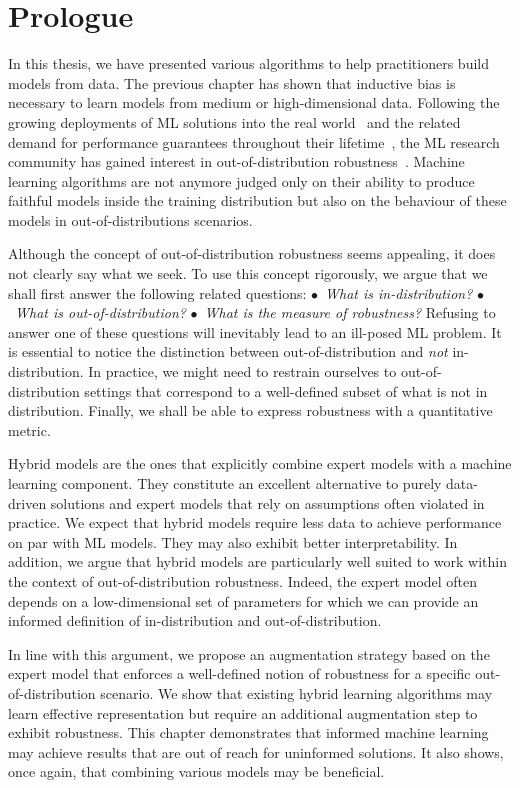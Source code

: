 \section{Prologue}
In this thesis, we have presented various algorithms to help practitioners build models from data. The previous chapter has shown that inductive bias is necessary to learn models from medium or high-dimensional data. Following the growing deployments of ML solutions into the real world~\citep{wehenkel1998automatic} and the related demand for performance guarantees throughout their lifetime~\citep{lwakatare2020large}, the ML research community has gained interest in out-of-distribution robustness~\citep{sehwag2019analyzing, hendrycks2021many}. Machine learning algorithms are not anymore judged only on their ability to produce faithful models inside the training distribution but also on the behaviour of these models in out-of-distributions scenarios.

Although the concept of out-of-distribution robustness seems appealing, it does not clearly say what we seek. To use this concept rigorously, we argue that we shall first answer the following related questions: $\bullet$~\textit{What is in-distribution?} $\bullet$~\textit{What is out-of-distribution?}  $\bullet$~\textit{What is the measure of robustness?} Refusing to answer one of these questions will inevitably lead to an ill-posed ML problem. It is essential to notice the distinction between out-of-distribution and \textit{not} in-distribution. In practice, we might need to restrain ourselves to out-of-distribution settings that correspond to a well-defined subset of what is not in distribution. Finally, we shall be able to express robustness with a quantitative metric.

Hybrid models are the ones that explicitly combine expert models with a machine learning component. They constitute an excellent alternative to purely data-driven solutions and expert models that rely on assumptions often violated in practice. We expect that hybrid models require less data to achieve performance on par with ML models. They may also exhibit better interpretability. In addition, we argue that hybrid models are particularly well suited to work within the context of out-of-distribution robustness. Indeed, the expert model often depends on a low-dimensional set of parameters for which we can provide an informed definition of in-distribution and out-of-distribution.

In line with this argument, we propose an augmentation strategy based on the expert model that enforces a well-defined notion of robustness for a specific out-of-distribution scenario. We show that existing hybrid learning algorithms may learn effective representation but require an additional augmentation step to exhibit robustness. This chapter demonstrates that informed machine learning may achieve results that are out of reach for uninformed solutions. It also shows, once again, that combining various models may be beneficial.

